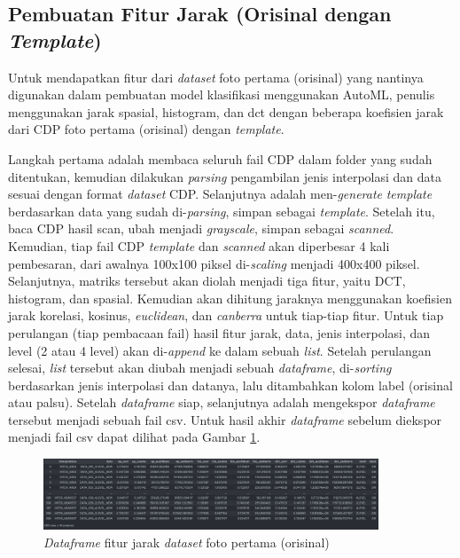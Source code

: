 \subsection{Pembuatan Fitur Jarak (Orisinal dengan \emph{Template})}
Untuk mendapatkan fitur dari \emph{dataset} foto pertama (orisinal) yang nantinya digunakan dalam pembuatan model klasifikasi menggunakan AutoML, penulis menggunakan jarak spasial, histogram, dan dct dengan beberapa koefisien jarak dari CDP foto pertama (orisinal) dengan \emph{template}.

Langkah pertama adalah membaca seluruh fail CDP dalam folder yang sudah ditentukan, kemudian dilakukan \emph{parsing} pengambilan jenis interpolasi dan data
sesuai dengan format \emph{dataset} CDP. Selanjutnya adalah men-\emph{generate} \emph{template} berdasarkan data yang sudah di-\emph{parsing}, simpan sebagai
\emph{template}. Setelah itu, baca CDP hasil scan, ubah menjadi \emph{grayscale}, simpan sebagai \emph{scanned}. Kemudian, tiap fail CDP \emph{template} dan
\emph{scanned} akan diperbesar 4 kali pembesaran, dari awalnya 100x100 piksel di-\emph{scaling} menjadi 400x400 piksel. Selanjutnya, matriks tersebut akan
diolah menjadi tiga fitur, yaitu DCT, histogram, dan spasial. Kemudian akan dihitung jaraknya menggunakan koefisien jarak korelasi, kosinus, \emph{euclidean},
dan \emph{canberra} untuk tiap-tiap fitur. Untuk tiap perulangan (tiap pembacaan fail) hasil fitur jarak, data, jenis interpolasi, dan level (2 atau 4 level)
akan di-\emph{append} ke dalam sebuah \emph{list}. Setelah perulangan selesai, \emph{list} tersebut akan diubah menjadi sebuah \emph{dataframe},
di-\emph{sorting} berdasarkan jenis interpolasi dan datanya, lalu ditambahkan kolom label (orisinal atau palsu). Setelah \emph{dataframe} siap, selanjutnya
adalah mengekspor \emph{dataframe} tersebut menjadi sebuah fail csv. Untuk hasil akhir \emph{dataframe} sebelum diekspor menjadi fail csv dapat dilihat pada
Gambar \ref{Fig: 3-dataframefitur}.

\begin{figure}[h]
	\centering
	\includegraphics[width=10cm]{contents/chapter-3/3-dataframefitur.png}
	\caption{\emph{Dataframe} fitur jarak \emph{dataset} foto pertama (orisinal)}
	\label{Fig: 3-dataframefitur}
\end{figure}

